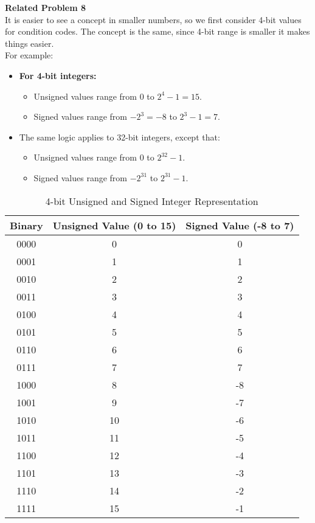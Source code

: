 \documentclass{article}
\begin{document}
\noindent\textbf{Related Problem 8} \\
It is easier to see a concept in smaller numbers, so we first consider 4-bit values for condition codes. The concept is the same, since 4-bit range is smaller it makes things easier. \\

For example: 
\begin{itemize}
    \item \textbf{For 4-bit integers:}
    \begin{itemize}
        \item Unsigned values range from $0$ to $2^4 - 1 = 15$.
        \item Signed values range from $-2^3 = -8$ to $2^3 - 1 = 7$.
    \end{itemize}
    \item The same logic applies to 32-bit integers, except that:
    \begin{itemize}
        \item Unsigned values range from $0$ to $2^{32} - 1$.
        \item Signed values range from $-2^{31}$ to $2^{31} - 1$.
    \end{itemize}
\end{itemize}

\begin{table}[h]
    \centering
    \renewcommand{\arraystretch}{1.2}
    \begin{tabular}{|c|c|c|}
        \hline
        \textbf{Binary} & \textbf{Unsigned Value (0 to 15)} & \textbf{Signed Value (-8 to 7)} \\
        \hline
        0000 & 0  & 0  \\
        0001 & 1  & 1  \\
        0010 & 2  & 2  \\
        0011 & 3  & 3  \\
        0100 & 4  & 4  \\
        0101 & 5  & 5  \\
        0110 & 6  & 6  \\
        0111 & 7  & 7  \\
        1000 & 8  & -8 \\
        1001 & 9  & -7 \\
        1010 & 10 & -6 \\
        1011 & 11 & -5 \\
        1100 & 12 & -4 \\
        1101 & 13 & -3 \\
        1110 & 14 & -2 \\
        1111 & 15 & -1 \\
        \hline
    \end{tabular}
    \caption{4-bit Unsigned and Signed Integer Representation}
    \label{four-bit-int}
\end{table}
\end{document}
